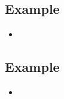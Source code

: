 \subsection{Example}
\begin{frame}{\insertsubsection}
	\begin{fancycolumns}
		\begin{definition}{\insertsubsection}
			\begin{itemize}
				\item 
			\end{itemize}
		\end{definition}
		\nextcolumn
	\end{fancycolumns}
\end{frame}

\subsection{Example}
\begin{frame}{\insertsubsection}
	\begin{fancycolumns}
		\begin{definition}{\insertsubsection}
			\begin{itemize}
				\item 
			\end{itemize}
		\end{definition}
		\nextcolumn
	\end{fancycolumns}
\end{frame}

